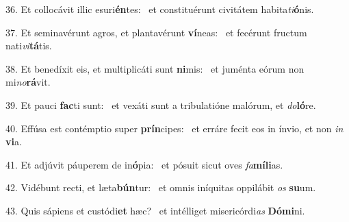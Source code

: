 36. Et collocávit illic esuri\textbf{én}tes: \ast\  et constituérunt civitátem habita\textit{ti}\textbf{ó}nis.\

37. Et seminavérunt agros, et plantavérunt \textbf{ví}neas: \ast\  et fecérunt fructum nati\textit{vi}\textbf{tá}tis.\

38. Et benedíxit eis, et multiplicáti sunt \textbf{ni}mis: \ast\  et juménta eórum non mi\textit{no}\textbf{rá}vit.\

39. Et pauci \textbf{fac}ti sunt: \ast\  et vexáti sunt a tribulatióne malórum, et \textit{do}\textbf{ló}re.\

40. Effúsa est contémptio super \textbf{prín}cipes: \ast\  et erráre fecit eos in ínvio, et non \textit{in} \textbf{vi}a.\

41. Et adjúvit páuperem de in\textbf{ó}pia: \ast\  et pósuit sicut oves \textit{fa}\textbf{mí}\textbf{li}as.\

42. Vidébunt recti, et læta\textbf{bún}tur: \ast\  et omnis iníquitas oppilábit \textit{os} \textbf{su}um.\

43. Quis sápiens et custódi\textbf{et} hæc? \ast\  et intélliget misericórdi\textit{as} \textbf{Dó}\textbf{mi}ni.\

